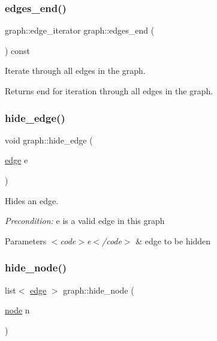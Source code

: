 \subsubsection{\texorpdfstring{edges\+\_\+end()}{edges\_end()}}
{\footnotesize\ttfamily graph\+::edge\+\_\+iterator graph\+::edges\+\_\+end (\begin{DoxyParamCaption}{ }\end{DoxyParamCaption}) const}

Iterate through all edges in the graph.

\begin{DoxyReturn}{Returns}
end for iteration through all edges in the graph. 
\end{DoxyReturn}
\mbox{\label{classgraph_ab2f8520bcac080d73c55228fecc61825}} 
\subsubsection{\texorpdfstring{hide\+\_\+edge()}{hide\_edge()}}
{\footnotesize\ttfamily void graph\+::hide\+\_\+edge (\begin{DoxyParamCaption}\item[{\mbox{\hyperlink{classedge}{edge}}}]{e }\end{DoxyParamCaption})}

Hides an edge.

{\itshape Precondition\+:} {\ttfamily e} is a valid edge in this graph


\begin{DoxyParams}{Parameters}
{\em $<$code$>$e$<$/code$>$} & edge to be hidden \\
\hline
\end{DoxyParams}
\mbox{\label{classgraph_a4f0177ffe8eaddd9c5bec73078bed873}} 
\subsubsection{\texorpdfstring{hide\+\_\+node()}{hide\_node()}}
{\footnotesize\ttfamily list$<$ \mbox{\hyperlink{classedge}{edge}} $>$ graph\+::hide\+\_\+node (\begin{DoxyParamCaption}\item[{\mbox{\hyperlink{classnode}{node}}}]{n }\end{DoxyParamCaption})}

